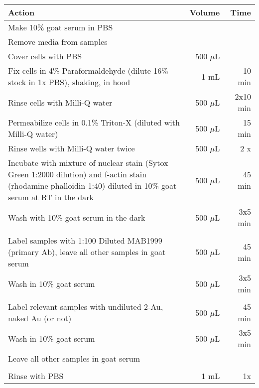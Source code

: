 \begin{table}[htbp]
\begin{minipage}{\linewidth}
\setlength{\tymax}{0.5\linewidth}
\centering
\small
\begin{tabular}{p{4in}rr} \toprule
Action&Volume&Time\tabularnewline
\midrule
Make 10\% goat serum in PBS&&\tabularnewline
Remove media from samples&&\tabularnewline
Cover cells with PBS&500 $\mu$L&\tabularnewline
Fix cells in 4\% Paraformaldehyde (dilute 16\% stock in 1x PBS), shaking, in hood&1 mL&10 min\tabularnewline
Rinse cells with Milli-Q water&500 $\mu$L&2x10 min\tabularnewline
Permeabilize cells in 0.1\% Triton-X (diluted with Milli-Q water) &500 $\mu$L&15 min\tabularnewline
Rinse wells with Milli-Q water twice&500 $\mu$L&2 x\tabularnewline
Incubate with mixture of nuclear stain (Sytox Green 1:2000 dilution) and f-actin stain (rhodamine phalloidin 1:40) diluted in 10\% goat serum at RT in the dark&500 $\mu$L&45 min\tabularnewline
Wash with 10\% goat serum in the dark&500 $\mu$L&3x5 min\tabularnewline
&&\tabularnewline
Label samples with 1:100 Diluted MAB1999 (primary Ab), leave all other samples in goat serum&500 $\mu$L&45 min\tabularnewline
Wash in 10\% goat serum&500 $\mu$L&3x5 min\tabularnewline
&&\tabularnewline
Label relevant samples with undiluted 2-Au, naked Au (or not)&500 $\mu$L&45 min\tabularnewline
Wash in 10\% goat serum&500 $\mu$L&3x5 min\tabularnewline
Leave all other samples in goat serum&&\tabularnewline
&&\tabularnewline
Rinse with PBS&1 mL&1x\tabularnewline

\bottomrule

\end{tabular}
\end{minipage}
\end{table}

